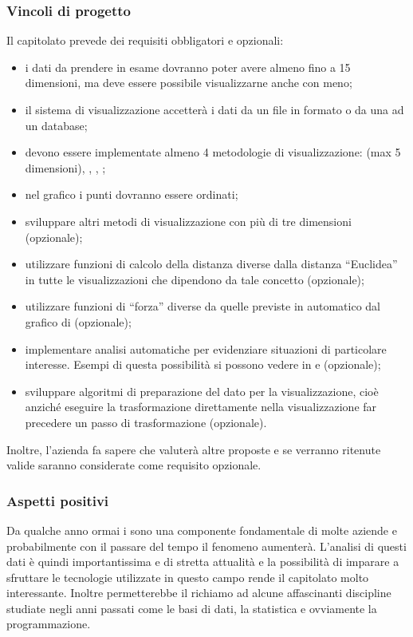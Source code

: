 \documentclass[]{article}
\begin{document}
		\subsubsection{Vincoli di progetto}
		Il capitolato prevede dei requisiti obbligatori e opzionali:
		\begin{itemize}
			\item i dati da prendere in esame dovranno poter avere almeno fino a 15 dimensioni, ma deve essere possibile visualizzarne anche con meno;
			\item il sistema di visualizzazione accetterà i dati da un file in formato  o da una  ad un database;
			\item devono essere implementate almeno 4 metodologie di visualizzazione:  (max 5 dimensioni), , , ;
			\item nel grafico  i punti dovranno essere ordinati;
			\item sviluppare altri metodi di visualizzazione con più di tre dimensioni (opzionale);
			\item utilizzare funzioni di calcolo della distanza diverse dalla distanza “Euclidea” in tutte le visualizzazioni che dipendono da tale concetto (opzionale);
			\item utilizzare funzioni di “forza” diverse da quelle previste in automatico dal grafico  di  (opzionale);
			\item implementare analisi automatiche per evidenziare situazioni di particolare interesse. Esempi di questa possibilità si possono vedere in  e  (opzionale);
			\item sviluppare algoritmi di preparazione del dato per la visualizzazione, cioè anziché eseguire la trasformazione direttamente nella visualizzazione far precedere un passo di trasformazione (opzionale).
		\end{itemize}
		Inoltre, l'azienda fa sapere che valuterà altre proposte e se verranno ritenute valide saranno considerate come requisito opzionale.

		\subsubsection{Aspetti positivi}
		Da qualche anno ormai i  sono una componente fondamentale di molte aziende e probabilmente con il passare del tempo il fenomeno aumenterà. L'analisi di questi dati è quindi importantissima e di stretta attualità e la possibilità di imparare a sfruttare le tecnologie utilizzate in questo campo rende il capitolato molto interessante. Inoltre permetterebbe il richiamo ad alcune affascinanti discipline studiate negli anni passati come le basi di dati, la statistica e ovviamente la programmazione.
\end{document}
